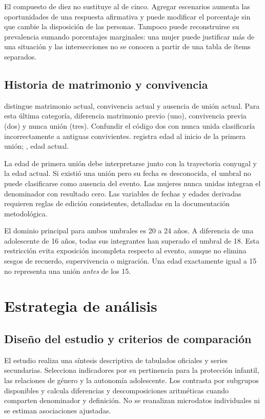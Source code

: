 \documentclass[11pt,a4paper]{article}
\newcommand{\var}[1]{\texttt{\detokenize{#1}}}
\begin{document}
El compuesto de diez no sustituye al de cinco. Agregar escenarios aumenta
las oportunidades de una respuesta afirmativa y puede modificar el porcentaje
sin que cambie la disposición de las personas. Tampoco puede reconstruirse
su prevalencia sumando porcentajes marginales: una mujer puede justificar
más de una situación y las intersecciones no se conocen a partir de una tabla
de ítems separados.

\subsection{Historia de matrimonio y convivencia}
\var{MA1} distingue matrimonio actual, convivencia actual y ausencia de unión
actual. Para esta última categoría, \var{MA5} diferencia matrimonio previo
(uno), convivencia previa (dos) y nunca unión (tres). Confundir el código dos
con nunca unida clasificaría incorrectamente a antiguas convivientes.
\var{MA9} registra edad al inicio de la primera unión; \var{WB2}, edad actual.

La edad de primera unión debe interpretarse junto con la trayectoria
conyugal y la edad actual. Si existió una unión pero su fecha es desconocida,
el umbral no puede clasificarse como ausencia del evento. Las mujeres nunca
unidas integran el denominador con resultado cero. Las variables de fechas
y edades derivadas requieren reglas de edición consistentes, detalladas en
la documentación metodológica.

El dominio principal para ambos umbrales es 20 a 24 años. A diferencia de una
adolescente de 16 años, todas sus integrantes han superado el umbral de 18.
Esta restricción evita exposición incompleta respecto al evento, aunque no
elimina sesgos de recuerdo, supervivencia o migración. Una edad exactamente
igual a 15 no representa una unión \emph{antes} de los 15.

\FloatBarrier
\section{Estrategia de análisis}
\subsection{Diseño del estudio y criterios de comparación}
El estudio realiza una síntesis descriptiva de tabulados oficiales y series
secundarias. Selecciona indicadores por su pertinencia para la protección
infantil, las relaciones de género y la autonomía adolescente. Los contrasta
por subgrupos disponibles y calcula diferencias y descomposiciones
aritméticas cuando comparten denominador y definición. No se reanalizan
microdatos individuales ni se estiman asociaciones ajustadas.
\end{document}
